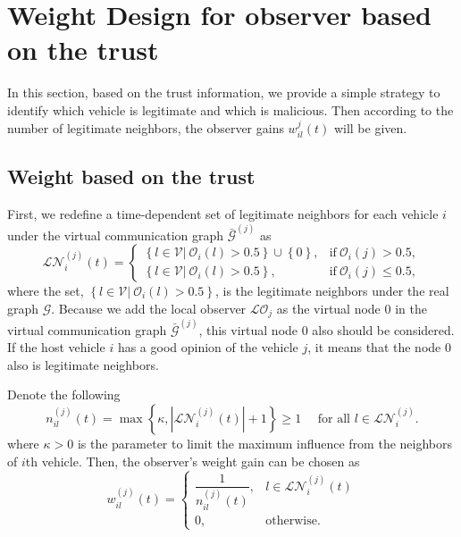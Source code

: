 \documentclass[letterpaper, 10pt, conference]{ieeeconf}  %
\def\V{\mathcal{V}} %
\def\G{\mathcal{G}} %
\def\LO{\mathcal{LO}} %
\def\O{\mathcal{O}} %
\begin{document}
\section{Weight Design for observer based on the trust}\label{sec_Weigth_Design}
In this section, based on the trust information, we provide a simple strategy to identify which vehicle is legitimate and which is malicious. Then according to the number of legitimate neighbors, the observer gains $w_{il}^{j}(t)$ will be given.

\subsection{Weight based on the trust}
First, we redefine a time-dependent set of legitimate neighbors for each vehicle $i$ under the virtual communication graph $\bar{\G}^{{(j)}}$ as
\begin{equation}
\mathcal{LN}_i^{(j)}(t)= 
\begin{cases}
    \left\{l \in \V| \  \O_{i}(l) > 0.5 \right\} \cup \left\{0 \right\},  & \text{if}\  \O_{i}(j)>0.5, \\
    \left\{l \in \V| \  \O_{i}(l) > 0.5 \right\}, & \text{if}\  \O_{i}(j) \leq 0.5,
\end{cases}
\end{equation}
where the set, $\left\{l \in \V| \  \O_{i}(l) > 0.5 \right\}$, is the  legitimate neighbors under the real graph $\G$. Because we add the local observer $\LO_{j}$ as the virtual node $0$ in the virtual communication graph $\bar{\G}^{{(j)}}$,  this virtual node $0$ also should be considered. If the host vehicle $i$ has a good opinion of the vehicle $j$, it means that the node $0$ also is legitimate neighbors.  

Denote the following 
\begin{equation}\label{new_setneibor}
n_{il}^{(j)}(t)=\max \left\{\kappa,\left|\mathcal{LN}_i^{(j)}(t)\right|+1\right\} \geq 1 \quad \text { for all } l \in \mathcal{LN}_i^{(j)}.
\end{equation}
where $\kappa >0$ is the parameter to limit the maximum influence from the neighbors of $i$th vehicle. 
Then, the observer's weight gain can be chosen as
\begin{equation}
    w_{il}^{(j)}(t) = \begin{cases}
        \dfrac{1}{n_{il}^{(j)}(t)}, & l \in \mathcal{LN}_i^{(j)}(t)\\
        0 ,& \text{otherwise}.
    \end{cases}
\end{equation}
\end{document}
